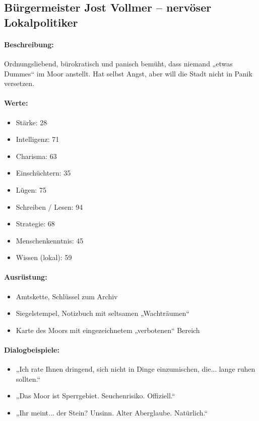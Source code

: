\subsection{Bürgermeister Jost Vollmer – nervöser Lokalpolitiker}
\paragraph{Beschreibung:}
Ordnungsliebend, bürokratisch und panisch bemüht, dass niemand „etwas Dummes“ im Moor anstellt. Hat selbst Angst, aber will die Stadt nicht in Panik versetzen.
\paragraph{Werte:}
\begin{itemize}
\item Stärke: 28
\item Intelligenz: 71
\item Charisma: 63
\item Einschüchtern: 35
\item Lügen: 75
\item Schreiben / Lesen: 94
\item Strategie: 68
\item Menschenkenntnis: 45
\item Wissen (lokal): 59
\end{itemize}
\paragraph{Ausrüstung:}
\begin{itemize}
\item Amtskette, Schlüssel zum Archiv
\item Siegelstempel, Notizbuch mit seltsamen „Wachträumen“
\item Karte des Moors mit eingezeichnetem „verbotenen“ Bereich
\end{itemize}
\paragraph{Dialogbeispiele:}
\begin{itemize}
\item „Ich rate Ihnen dringend, sich nicht in Dinge einzumischen, die... lange ruhen sollten.“
\item „Das Moor ist Sperrgebiet. Seuchenrisiko. Offiziell.“
\item „Ihr meint... der Stein? Unsinn. Alter Aberglaube. Natürlich.“
\end{itemize}
